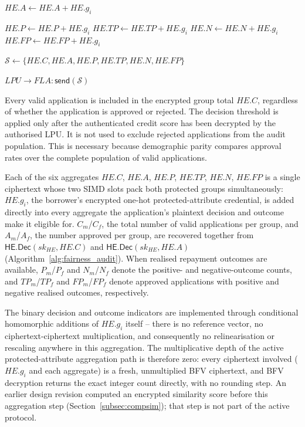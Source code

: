 \documentclass[a4paper,fleqn]{cas-dc}
\begin{document}
\begin{algorithm}[h]
\begin{algorithmic}[1]
        \State $HE.A \leftarrow HE.A + HE.g_i$
    \EndIf


            \State $HE.P \leftarrow HE.P + HE.g_i$
                \State $HE.TP \leftarrow HE.TP + HE.g_i$
            \EndIf
        \Else
            \State $HE.N \leftarrow HE.N + HE.g_i$
                \State $HE.FP \leftarrow HE.FP + HE.g_i$
            \EndIf
        \EndIf

    \EndIf

\EndFor

\State $\mathcal{S}
    \leftarrow
    \{
    HE.C,
    HE.A,
    HE.P,
    HE.TP,
    HE.N,
    HE.FP
    \}$

\State $LPU\rightarrow FLA:
    \mathsf{send}(\mathcal{S})$

\end{algorithmic}
\end{algorithm}



Every valid application is included in the encrypted group total $HE.C$,
regardless of whether the application is approved or rejected. The decision
threshold is applied only after the authenticated credit score has been
decrypted by the authorised LPU. It is not used to exclude rejected
applications from the audit population. This is necessary because demographic
parity compares approval rates over the complete population of valid
applications.

Each of the six aggregates $HE.C$, $HE.A$, $HE.P$, $HE.TP$, $HE.N$, $HE.FP$ is
a single ciphertext whose two SIMD slots pack both protected groups
simultaneously: $HE.g_i$, the borrower's encrypted one-hot protected-attribute
credential, is added directly into every aggregate the application's
plaintext decision and outcome make it eligible for. $C_m$/$C_f$, the total
number of valid applications per group, and $A_m$/$A_f$, the number approved
per group, are recovered together from $\mathsf{HE.Dec}(sk_{HE},HE.C)$ and
$\mathsf{HE.Dec}(sk_{HE},HE.A)$ (Algorithm~\ref{alg:fairness_audit}). When
realised repayment outcomes are available, $P_m$/$P_f$ and $N_m$/$N_f$ denote
the positive- and negative-outcome counts, and $TP_m$/$TP_f$ and
$FP_m$/$FP_f$ denote approved applications with positive and negative
realised outcomes, respectively.

The binary decision and outcome indicators are implemented through
conditional homomorphic additions of $HE.g_i$ itself -- there is no
reference vector, no ciphertext-ciphertext multiplication, and consequently
no relinearisation or rescaling anywhere in this aggregation. The
multiplicative depth of the active protected-attribute aggregation path is
therefore zero: every ciphertext involved ($HE.g_i$ and each aggregate) is a
fresh, unmultiplied BFV ciphertext, and BFV decryption returns the exact
integer count directly, with no rounding step. An earlier design revision
computed an encrypted similarity score before this aggregation step
(Section~\ref{subsec:compsim}); that step is not part of the active protocol.
\end{document}

